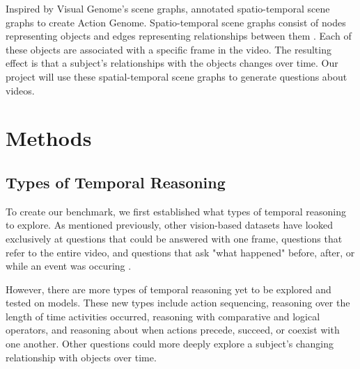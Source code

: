 \documentclass[10pt,twocolumn,letterpaper]{article}
\newcommand{\mgm}[1]{{\color{cyan}{mgm: #1}}}
\begin{document}
Inspired by Visual Genome's scene graphs, \cite{ji2020action} annotated spatio-temporal scene graphs to create Action Genome. Spatio-temporal scene graphs consist of nodes representing objects and edges representing relationships between them \mgm{(add in that these relationships are 3 categories?)}. Each of these objects are associated with a specific frame in the video. The resulting effect is that a subject's relationships with the objects changes over time. Our project will use these spatial-temporal scene graphs to generate questions about videos. 

\section{Methods}

\subsection{Types of Temporal Reasoning}
To create our benchmark, we first established what types of temporal reasoning to explore. As mentioned previously, other vision-based datasets have looked exclusively at questions that could be answered with one frame, questions that refer to the entire video, and questions that ask "what happened" before, after, or while an event was occuring \cite{tapaswi2016movieqa, lei2018tvqa, jang2017tgif, kim2017deepstory, xu2017video, maharaj2017dataset, zeng2016leveraging, yu2019activitynet}. 


However, there are more types of temporal reasoning yet to be explored and tested on models. These new types include action sequencing, reasoning over the length of time activities occurred, reasoning with comparative and logical operators, and reasoning about when actions precede, succeed, or coexist with one another. Other questions could more deeply explore a subject's changing relationship with objects over time. 
\end{document}
